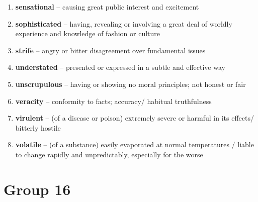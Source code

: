 \begin{enumerate}[wide,labelindent=0pt]
\item \textbf{sensational} -- causing great public interest and excitement
\item \textbf{sophisticated} -- having, revealing or involving a great deal of worldly experience and knowledge of fashion or culture
\item \textbf{strife} -- angry or bitter disagreement over fundamental issues
\item \textbf{understated} -- presented or expressed in a subtle and effective way
\item \textbf{unscrupulous} -- having or showing no moral principles; not honest or fair
\item \textbf{veracity} -- conformity to facts; accuracy/ habitual truthfulness
\item \textbf{virulent} -- (of a disease or poison) extremely severe or harmful in its effects/ bitterly hostile
\item \textbf{volatile} -- (of a substance) easily evaporated at normal temperatures / liable to change rapidly and unpredictably, especially for the worse
\end{enumerate}

\newpage
\section{Group 16}


